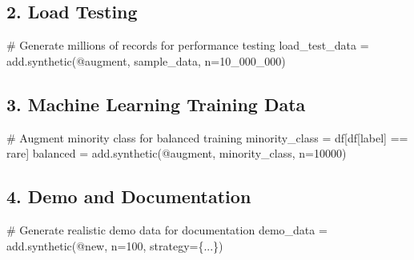 \documentclass[
  letterpaper,
]{scrbook}
\newenvironment{Shaded}{\begin{snugshade}}{\end{snugshade}}
\newcommand{\CommentTok}[1]{\textcolor[rgb]{0.37,0.37,0.37}{#1}}
\newcommand{\DecValTok}[1]{\textcolor[rgb]{0.68,0.00,0.00}{#1}}
\newcommand{\NormalTok}[1]{\textcolor[rgb]{0.00,0.23,0.31}{#1}}
\newcommand{\OperatorTok}[1]{\textcolor[rgb]{0.37,0.37,0.37}{#1}}
\newcommand{\StringTok}[1]{\textcolor[rgb]{0.13,0.47,0.30}{#1}}
\begin{document}
\subsection{2. Load Testing}\label{load-testing}

\begin{Shaded}
\begin{Highlighting}[]
\CommentTok{\# Generate millions of records for performance testing}
\NormalTok{load\_test\_data }\OperatorTok{=}\NormalTok{ add.synthetic(}\StringTok{\textquotesingle{}@augment\textquotesingle{}}\NormalTok{, sample\_data, n}\OperatorTok{=}\DecValTok{10\_000\_000}\NormalTok{)}
\end{Highlighting}
\end{Shaded}

\subsection{3. Machine Learning Training
Data}\label{machine-learning-training-data}

\begin{Shaded}
\begin{Highlighting}[]
\CommentTok{\# Augment minority class for balanced training}
\NormalTok{minority\_class }\OperatorTok{=}\NormalTok{ df[df[}\StringTok{\textquotesingle{}label\textquotesingle{}}\NormalTok{] }\OperatorTok{==} \StringTok{\textquotesingle{}rare\textquotesingle{}}\NormalTok{]}
\NormalTok{balanced }\OperatorTok{=}\NormalTok{ add.synthetic(}\StringTok{\textquotesingle{}@augment\textquotesingle{}}\NormalTok{, minority\_class, n}\OperatorTok{=}\DecValTok{10000}\NormalTok{)}
\end{Highlighting}
\end{Shaded}

\subsection{4. Demo and Documentation}\label{demo-and-documentation}

\begin{Shaded}
\begin{Highlighting}[]
\CommentTok{\# Generate realistic demo data for documentation}
\NormalTok{demo\_data }\OperatorTok{=}\NormalTok{ add.synthetic(}\StringTok{\textquotesingle{}@new\textquotesingle{}}\NormalTok{, n}\OperatorTok{=}\DecValTok{100}\NormalTok{, strategy}\OperatorTok{=}\NormalTok{\{...\})}
\end{Highlighting}
\end{Shaded}
\end{document}
